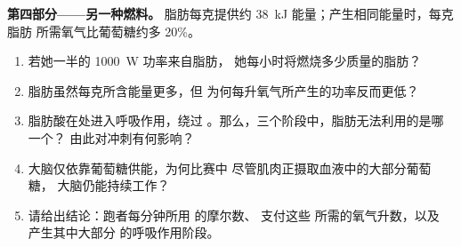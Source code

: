 \begin{problem}
\medskip
\noindent\textbf{第四部分——另一种燃料。}
脂肪每克提供约 \qty{38}{kJ} 能量；产生相同能量时，每克脂肪
所需氧气比葡萄糖约多 20\%。
\begin{enumerate}[resume]
  \item 若她一半的 \qty{1000}{W} 功率来自脂肪，
        她每小时将燃烧多少质量的脂肪？
  \item 脂肪虽然每克所含能量更多，但
        为何每升氧气所产生的功率反而更低？
  \item 脂肪酸在处进入呼吸作用，绕过
        。那么，三个阶段中，脂肪无法利用的是哪一个？
        由此对冲刺有何影响？
  \item 大脑仅依靠葡萄糖供能，为何比赛中
        尽管肌肉正摄取血液中的大部分葡萄糖，
        大脑仍能持续工作？
  \item 请给出结论：跑者每分钟所用  的摩尔数、
        支付这些  所需的氧气升数，以及
        产生其中大部分  的呼吸作用阶段。
\end{enumerate}
\end{problem}
